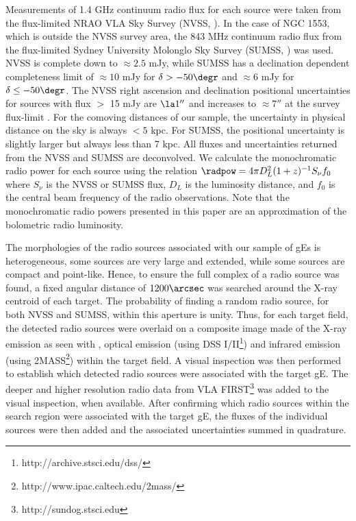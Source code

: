 \documentclass{emulateapj}
\begin{document}
Measurements of 1.4 GHz continuum radio flux for each source were
taken from the flux-limited NRAO VLA Sky Survey (NVSS,
\citealt{nvss}). In the case of NGC 1553, which is outside the NVSS
survey area, the 843 MHz continuum radio flux from the flux-limited
Sydney University Molonglo Sky Survey (SUMSS, \citealt{sumss1,
  sumss2}) was used. NVSS is complete down to $\approx 2.5$ mJy, while
SUMSS has a declination dependent completeness limit of $\approx 10$
mJy for $\delta > -50\degr$ and $\approx 6$ mJy for $\delta \leq
-50\degr$. The NVSS right ascension and declination positional
uncertainties for sources with flux $>$ 15 mJy are $\la 1''$ and
increases to $\approx 7''$ at the survey flux-limit \citep{nvss}. For
the comoving distances of our sample, the uncertainty in physical
distance on the sky is always $< 5$ kpc. For SUMSS, the positional
uncertainty is slightly larger but always less than 7 kpc. All fluxes
and uncertainties returned from the NVSS and SUMSS are deconvolved. We
calculate the monochromatic radio power for each source using the
relation $\radpow = 4 \pi D_L^2 (1+z)^{-1} S_{\nu} f_0$ where
$S_{\nu}$ is the NVSS or SUMSS flux, $D_L$ is the luminosity distance,
and $f_0$ is the central beam frequency of the radio
observations. Note that the monochromatic radio powers presented in
this paper are an approximation of the bolometric radio luminosity.

The morphologies of the radio sources associated with our sample of
gEs is heterogeneous, some sources are very large and extended, while
some sources are compact and point-like. Hence, to ensure the full
complex of a radio source was found, a fixed angular distance of
$1200\arcsec$ was searched around the X-ray centroid of each
target. The probability of finding a random radio source, for both
NVSS and SUMSS, within this aperture is unity. Thus, for each target
field, the detected radio sources were overlaid on a composite image
made of the X-ray emission as seen with \chandra, optical emission
(using DSS I/II\footnote{http://archive.stsci.edu/dss/}) and infrared
emission (using 2MASS\footnote{http://www.ipac.caltech.edu/2mass/})
within the target field. A visual inspection was then performed to
establish which detected radio sources were associated with the target
gE. The deeper and higher resolution radio data from VLA
FIRST\footnote{http://sundog.stsci.edu} was added to the visual
inspection, when available. After confirming which radio sources
within the search region were associated with the target gE, the
fluxes of the individual sources were then added and the associated
uncertainties summed in quadrature.
\end{document}
